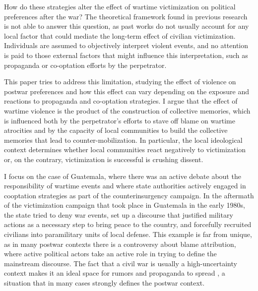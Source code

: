 \documentclass[12pt, notitlepage]{article}
\begin{document}
How do these strategies alter the effect of wartime victimization on political preferences after the war?
The theoretical framework found in previous research is not able to answer this question, as past works do not usually account for any local factor that could mediate the long-term effect of civilian victimization.
Individuals are assumed to objectively interpret violent events, and no attention is paid to those external factors that might influence this interpretation, such as propaganda or co-optation efforts by the perpetrator.

This paper tries to address this limitation, studying the effect of violence on postwar preferences and how this effect can vary depending on the exposure and reactions to propaganda and co-optation strategies.
I argue that the effect of wartime violence is the product of the construction of collective memories, which is influenced both by the perpetrator's efforts to stave off blame on wartime atrocities and by the capacity of local communities to build the collective memories that lead to counter-mobilization.
In particular, the local ideological context determines whether local communities react negatively to victimization or, on the contrary, victimization is successful is crushing dissent.

I focus on the case of Guatemala, where there was an active debate about the responsibility of wartime events and where state authorities actively engaged in cooptation strategies as part of the counterinsurgency campaign.
In the aftermath of the victimization campaign that took place in Guatemala in the early 1980s, the state tried to deny war events, set up a discourse that justified military actions as a necessary step to bring peace to the country, and forcefully recruited civilians into paramilitary units of local defense.
This example is far from unique, as in many postwar contexts there is a controversy about blame attribution, where active political actors take an active role in trying to define the mainstream discourse.
The fact that a civil war is usually a high-uncertainty context makes it an ideal space for rumors and propaganda to spread \citep{Schon:2021wf}, a situation that in many cases strongly defines the postwar context.
\end{document}
